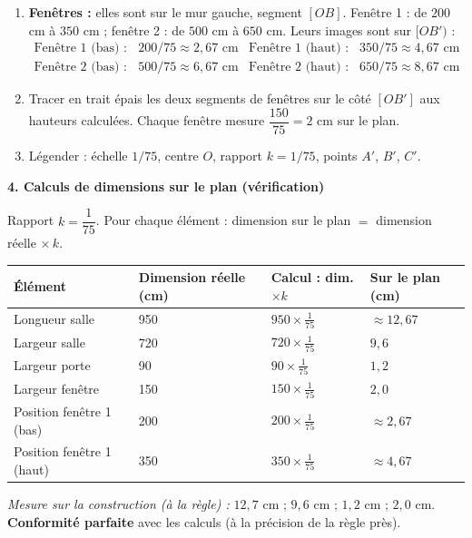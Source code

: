 \documentclass[11pt]{article}
\begin{document}
\begin{exoresolu}
\begin{enumerate}
    \item \textbf{Fenêtres :} elles sont sur le mur gauche, segment $[OB]$. Fenêtre 1 : de $200$ cm à $350$ cm ; fenêtre 2 : de $500$ cm à $650$ cm. Leurs images sont sur $[OB')$ :
    \begin{align*}
        \text{Fenêtre 1 (bas) : } & 200/75 \approx 2,67 \text{ cm} &
        \text{Fenêtre 1 (haut) : } & 350/75 \approx 4,67 \text{ cm} \\
        \text{Fenêtre 2 (bas) : } & 500/75 \approx 6,67 \text{ cm} &
        \text{Fenêtre 2 (haut) : } & 650/75 \approx 8,67 \text{ cm}
    \end{align*}
    \item Tracer en trait épais les deux segments de fenêtres sur le côté $[OB']$ aux hauteurs calculées. Chaque fenêtre mesure $\dfrac{150}{75} = 2$ cm sur le plan.
    \item Légender : échelle $1/75$, centre $O$, rapport $k = 1/75$, points $A'$, $B'$, $C'$.
\end{enumerate}

\textbf{4. Calculs de dimensions sur le plan (vérification)}
\par Rapport $k = \dfrac{1}{75}$. Pour chaque élément : dimension sur le plan $=$ dimension réelle $\times \, k$.
\begin{center}
\begin{tabularx}{\linewidth}{|l|X|X|X|}\hline
\rowcolor{popblueL}
\textbf{Élément} & \textbf{Dimension réelle (cm)} & \textbf{Calcul : dim. $\times k$} & \textbf{Sur le plan (cm)} \\ \hline
Longueur salle & 950 & $950 \times \frac{1}{75}$ & $\approx 12,67$ \\ \hline
Largeur salle & 720 & $720 \times \frac{1}{75}$ & $9,6$ \\ \hline
Largeur porte & 90 & $90 \times \frac{1}{75}$ & $1,2$ \\ \hline
Largeur fenêtre & 150 & $150 \times \frac{1}{75}$ & $2,0$ \\ \hline
Position fenêtre 1 (bas) & 200 & $200 \times \frac{1}{75}$ & $\approx 2,67$ \\ \hline
Position fenêtre 1 (haut) & 350 & $350 \times \frac{1}{75}$ & $\approx 4,67$ \\ \hline
\end{tabularx}
\end{center}
\par \emph{Mesure sur la construction (à la règle) :} $12,7$ cm ; $9,6$ cm ; $1,2$ cm ; $2,0$ cm. \textbf{Conformité parfaite} avec les calculs (à la précision de la règle près).


\end{exoresolu}
\end{document}
